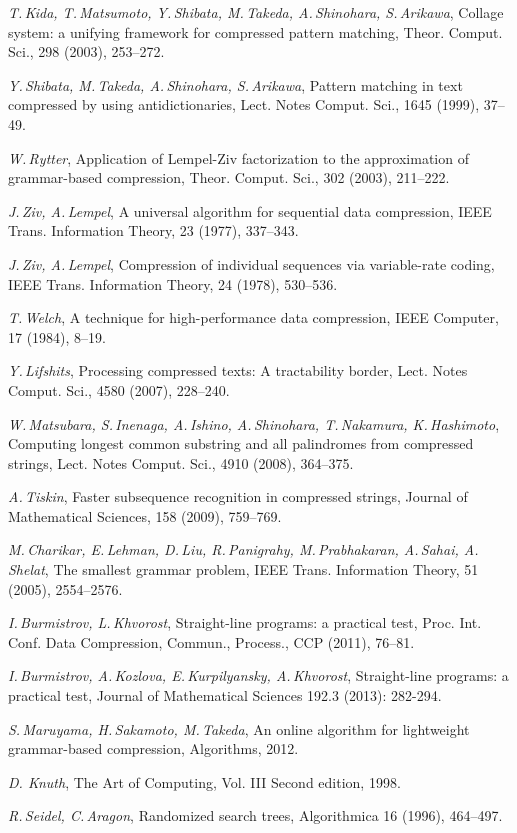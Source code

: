 \documentclass[14pt]{article}
\begin{document}
\begin{thebibliography}{99}

\textsl{T.\,Kida, T.\,Matsumoto, Y.\,Shibata, M.\,Takeda, A.\,Shinohara, S.\,Arikawa}, Collage system: a unifying
framework for compressed pattern matching, Theor. Comput. Sci., 298 (2003), 253--272.

\textsl{Y.\,Shibata, M.\,Takeda, A.\,Shinohara, S.\,Arikawa}, Pattern matching in text compressed by using
antidictionaries, Lect. Notes Comput. Sci., 1645 (1999), 37--49.

\textsl{W.\,Rytter}, Application of {L}empel-{Z}iv factorization to the approximation of grammar-based compression,
Theor. Comput. Sci., 302 (2003), 211--222.

\textsl{J.\,Ziv, A.\,Lempel}, A universal algorithm for sequential data compression, IEEE Trans. Information Theory, 23 (1977), 337--343.

\textsl{J.\,Ziv, A.\,Lempel}, Compression of individual sequences via variable-rate coding, IEEE Trans. Information Theory, 24 (1978),
530--536.

\textsl{T.\,Welch}, A technique for high-performance data compression, IEEE Computer, 17 (1984), 8--19.

\textsl{Y.\,Lifshits}, Processing compressed texts: A tractability border, Lect. Notes Comput. Sci., 4580 (2007), 228--240.

\textsl{W.\,Matsubara, S.\,Inenaga, A.\,Ishino, A.\,Shinohara, T.\,Nakamura, K.\,Hashimoto}, Computing longest common
substring and all palindromes from compressed strings, Lect. Notes Comput. Sci., 4910 (2008), 364--375.

\textsl{A.\,Tiskin}, Faster subsequence recognition in compressed strings, Journal of Mathematical Sciences, 158 (2009),
759--769.

\textsl{M.\,Charikar, E.\,Lehman,  D.\,Liu, R.\,Panigrahy, M.\,Prabhakaran, A.\,Sahai, A.\,Shelat}, The smallest grammar problem, IEEE
Trans. Information Theory, 51 (2005), 2554--2576.

\textsl{I.\,Burmistrov, L.\,Khvorost}, Straight-line programs: a practical test, Proc. Int. Conf. Data Compression, Commun., Process., CCP
(2011), 76--81.

\textsl{I.\,Burmistrov, A.\,Kozlova, E.\,Kurpilyansky, A.\,Khvorost}, Straight-line programs: a practical test,
Journal of Mathematical Sciences 192.3 (2013): 282-294.

\textsl{S.\,Maruyama, H.\,Sakamoto, M.\,Takeda}, An online algorithm for lightweight grammar-based compression, Algorithms, 2012.

\textsl{D. Knuth}, The Art of Computing, Vol. III Second edition, 1998.

\textsl{R.\,Seidel, C.\,Aragon}, Randomized search trees, Algorithmica 16 (1996), 464--497.

\end{thebibliography}
\end{document}
